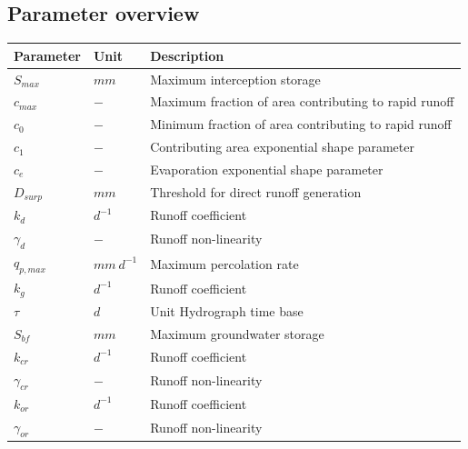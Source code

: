 \subsection{Parameter overview}
\begin{table}[htbp]
  \centering
    \begin{tabular}{lll}
    \toprule
    Parameter & Unit  & Description \\
    \midrule
    $S_{max}$ & $mm$  & Maximum interception storage \\
    $c_{max}$ & $-$   & Maximum fraction of area contributing to rapid runoff \\
    $c_0$ & $-$   & Minimum fraction of area contributing to rapid runoff \\
    $c_1$ & $-$   & Contributing area exponential shape parameter \\
    $c_e$ & $-$   & Evaporation exponential shape parameter \\
    $D_{surp}$ & $mm$  & Threshold for direct runoff generation \\
    $k_d$ & $d^{-1}$ & Runoff coefficient \\
    $\gamma_d$ & $-$   & Runoff non-linearity \\
    $q_{p,max}$ & $mm~d^{-1}$ & Maximum percolation rate \\
    $k_g$ & $d^{-1}$ & Runoff coefficient \\
    $\tau$ & $d$   & Unit Hydrograph time base \\
    $S_{bf}$ & $mm$  & Maximum groundwater storage \\
    $k_{cr}$ & $d^{-1}$ & Runoff coefficient \\
    $\gamma_{cr}$ & $-$   & Runoff non-linearity \\
    $k_{or}$ & $d^{-1}$ & Runoff coefficient \\
    $\gamma_{or}$ & $-$   & Runoff non-linearity \\
    \bottomrule
    \end{tabular}%
  \label{tab:addlabel}%
\end{table}%
